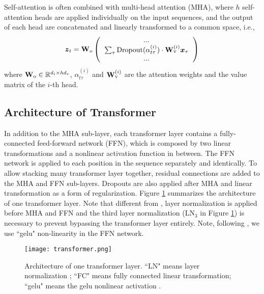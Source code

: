 \documentclass{article}
\begin{document}
Self-attention is often combined with multi-head attention (MHA), where $h$ self-attention heads are applied individually on the input sequences, and the output of each head are concatenated and linearly transformed to a common space, i.e., 
\begin{align}
    \boldsymbol{z}_t = \mathbf{W}_{\rm o}\left( 
    \begin{tabular}{c}
        ... \\
        $\sum_{\tau} \mathrm{Dropout}(\alpha_{t\tau}^{(i)}) \cdot \mathbf{W}_{\rm v}^{(i)} \boldsymbol{x}_\tau$  \\
         ... 
    \end{tabular}
    \right)
\end{align}
where $\mathbf{W}_{\rm o} \in \mathbb{R}^{d_i \times hd_{\rm v}}$, $\alpha_{t\tau}^{(i)}$ and $\mathbf{W}^{(i)}_{\rm v}$ are the attention weights and the value matrix of the $i$-th head. 

\subsection{Architecture of Transformer}
In addition to the MHA sub-layer, each transformer layer contains a fully-connected feed-forward network (FFN), which is composed by two linear transformations and a nonlinear activation function in between.
The FFN network is applied to each position in the sequence separately and identically. To allow stacking many transformer layer together, residual connections are added to the MHA and FFN sub-layers. Dropouts are also applied after MHA and linear transformation as a form of regularization. Figure \ref{fig:transformer_layer} summarizes the architecture of one transformer layer. Note 
that different from \cite{vaswani2017attention}, layer normalization \cite{lei2016layer} is applied before MHA and FFN and the third layer normalization ($\mathrm{LN}_3$ in Figure \ref{fig:transformer_layer}) is necessary to prevent bypassing the transformer layer entirely. Note, following \cite{devlin2018bert}, we use ``gelu" non-linearity \cite{hendrycks2016gaussian} in the FFN network.

\begin{figure}[hhh]
    \centering
    \texttt{[image: transformer.png]}
    \caption{Architecture of one transformer layer. ``LN" means layer normalization \cite{lei2016layer}; ``FC" means fully connected linear transformation; ``gelu" means the gelu nonlinear activation \cite{hendrycks2016gaussian}.\vspace{1em}}
    \label{fig:transformer_layer}
\end{figure}
\end{document}
